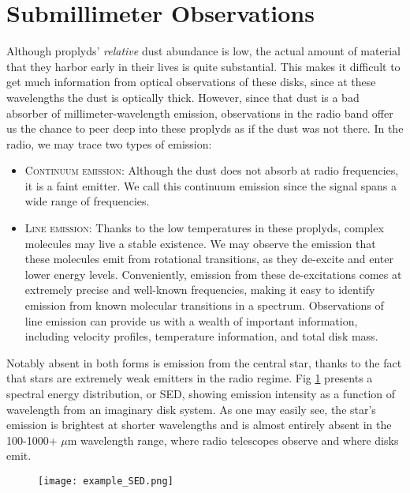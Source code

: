 \section{Submillimeter Observations}

Although proplyds' \textit{relative} dust abundance is low, the actual amount of material that they harbor early in their lives is quite substantial. This makes it difficult to get much information from optical observations of these disks, since at these wavelengths the dust is optically thick. However, since that dust is a bad absorber of millimeter-wavelength emission, observations in the radio band offer us the chance to peer deep into these proplyds as if the dust was not there. In the radio, we may trace two types of emission:

\begin{itemize}
  \item \textsc{Continuum emission}: Although the dust does not absorb at radio frequencies, it is a faint emitter. We call this continuum emission since the signal spans a wide range of frequencies.

  \item \textsc{Line emission}: Thanks to the low temperatures in these proplyds, complex molecules may live a stable existence. We may observe the emission that these molecules emit from rotational transitions, as they de-excite and enter lower energy levels. Conveniently, emission from these de-excitations comes at extremely precise and well-known frequencies, making it easy to identify emission from known molecular transitions in a spectrum. Observations of line emission can provide us with a wealth of important information, including velocity profiles, temperature information, and total disk mass.
\end{itemize}

Notably absent in both forms is emission from the central star, thanks to the fact that stars are extremely weak emitters in the radio regime. Fig \ref{fig:SED} presents a spectral energy distribution, or SED, showing emission intensity as a function of wavelength from an imaginary disk system. As one may easily see, the star's emission is brightest at shorter wavelengths and is almost entirely absent in the 100-1000+ $\mu$m wavelength range, where radio telescopes observe and where disks emit.

\begin{figure}
\centering
  \texttt{[image: example\_SED.png]}
  \label{fig:SED}
\end{figure}

